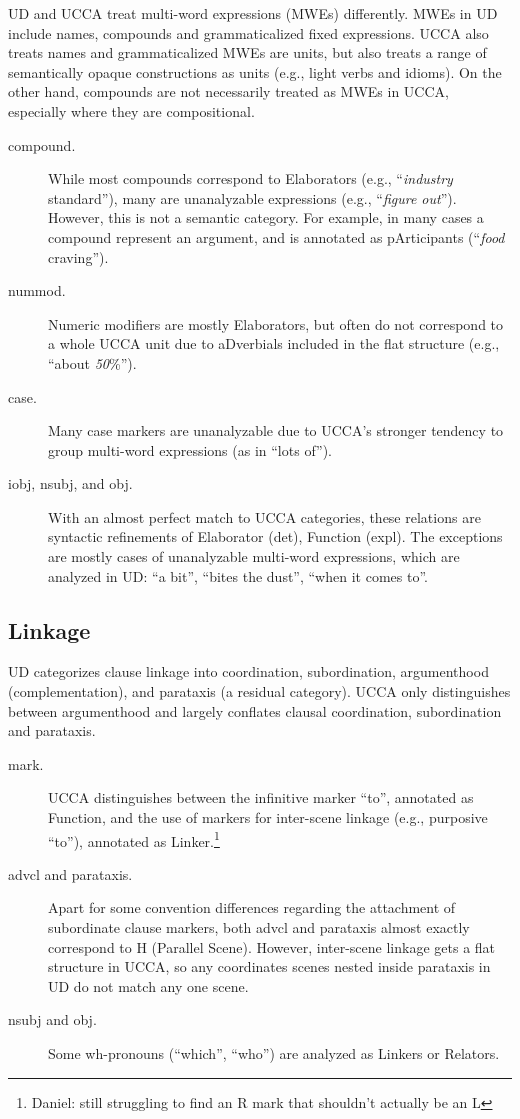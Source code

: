 \documentclass[11pt,a4paper]{article}
\newcommand{\daniel}[1]{\footnote{\color{blue}Daniel: #1}}
\begin{document}
      UD and UCCA treat multi-word expressions (MWEs) differently.
      MWEs in UD include names, compounds and grammaticalized fixed expressions.
      UCCA also treats names and grammaticalized MWEs are units,
      but also treats a range of semantically opaque constructions as units
      (e.g., light verbs and idioms).
      On the other hand, compounds are not necessarily treated as MWEs in UCCA,
      especially where they are compositional.
\begin{description}
	\item[compound.]
	While most compounds correspond to Elaborators (e.g., ``\textit{industry} standard''),
	many are unanalyzable expressions (e.g., ``\textit{figure out}'').
	However, this is not a semantic category.
	For example, in many cases a compound represent an argument,
	and is annotated as pArticipants (``\textit{food} craving'').
	\item[nummod.]
	Numeric modifiers are mostly Elaborators, but often do not correspond to a whole UCCA unit
	due to aDverbials included in the flat structure (e.g., ``about \textit{50}\%'').
	\item[case.]
	Many case markers are unanalyzable due to UCCA's stronger tendency to group
	multi-word expressions (as in ``lots of'').
	\item[iobj, nsubj, and obj.]
	With an almost perfect match to UCCA categories,
	these relations are syntactic refinements of
	Elaborator (det), Function (expl).
	The exceptions are mostly cases of unanalyzable multi-word expressions,
	which are analyzed in UD: ``a bit'', ``bites the dust'', ``when it comes to''.
\end{description}

\subsection{Linkage}\label{sec:linkage}

      UD categorizes clause linkage into coordination,
      subordination, argumenthood (complementation),
      and parataxis (a residual category).
      UCCA only distinguishes between argumenthood 
      and largely conflates clausal coordination, subordination and parataxis.
\begin{description}
	\item[mark.]
	UCCA distinguishes between the infinitive marker ``to'', annotated as Function,
	and the use of markers for inter-scene linkage (e.g., purposive ``to''),
	annotated as Linker.\daniel{still struggling to find an R mark that shouldn't actually be an L}
	\item[advcl and parataxis.]
	Apart for some convention differences regarding the attachment of subordinate clause markers,
	both advcl and parataxis almost exactly correspond to H (Parallel Scene).
	However, inter-scene linkage gets a flat structure in UCCA,
	so any coordinates scenes nested inside parataxis in UD do not match any one scene.
	\item[nsubj and obj.]
	Some wh-pronouns (``which'', ``who'') are analyzed as Linkers or Relators.
\end{description}
	
\end{document}
